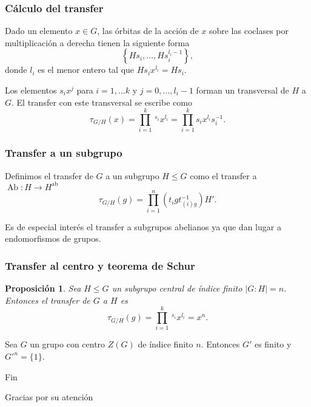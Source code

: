 \documentclass[
	11pt, %
]{beamer}
\DeclareMathOperator{\AbFunctor}{Ab}
\newcommand{\Ab}[1]{#1^\text{ab}}
\newcommand{\ord}[1]{\left|#1\right|}%
\newcommand{\homo}[3]{#1\colon #2\to #3}
\newcommand{\transfer}[2]{\tau_{#1/ #2}}
\newtheorem{proposition}{Proposici\'on}
\begin{document}
\begin{frame}
	\frametitle{Cálculo del transfer}
	Dado un elemento $x\in G$, las órbitas de la acción de $x$ sobre las coclases por multiplicación a derecha tienen la siguiente forma
	$$
		\left\{Hs_i,\ldots,Hs_i^{l_i-1}\right\},
	$$
	donde $l_i$ es el menor entero tal que $Hs_ix^{l_i} = Hs_i$.
	
	Los elementos $s_ix^j$ para $i=1,\ldots k$ y $j=0,\ldots,l_i-1$ forman un transversal de $H$ a $G$.
	El transfer con este transversal se escribe como
	$$
		{\transfer G H}(x) = \prod_{i=1}^{k}\,^{s_i}x^{l_i} = \prod_{i=1}^{k}s_ix^{l_i}s_i^{-1}.
	$$
\end{frame}

\begin{frame}
	\frametitle{Transfer a un subgrupo}
	Definimos el transfer de $G$ a un subgrupo $H\leq G$ como el transfer a $\homo \AbFunctor H {\Ab H}$
	$$
		{\transfer G H}(g) = \prod_{i=1}^n \left(t_igt_{(i)g}^{-1}\right)H'.
	$$
	
	Es de especial interés el transfer a subgrupos abelianos ya que dan lugar a endomorfismos de grupos.
\end{frame}

\begin{frame}
	\frametitle{Transfer al centro y teorema de Schur}
	\begin{proposition}
		Sea $H\leq G$ un subgrupo central de índice finito $\ord{G:H} = n$. Entonces el transfer de $G$ a $H$ es
		$$
			{\transfer G H}(g) = \prod_{i=1}^k \,^{s_i}x^{l_i} = x^n.
		$$
	\end{proposition}
	\begin{theorem}[Schur]
		Sea $G$ un grupo con centro $Z(G)$ de índice finito $n$. Entonces $G'$ es finito y $G'^n = \{1\}$.
	\end{theorem}
\end{frame}


\begin{frame}[plain] %
	\begin{center}
		{\Huge Fin}
		
		\bigskip\bigskip %
		
		{\LARGE Gracias por su atención}
	\end{center}
\end{frame}

\end{document}
